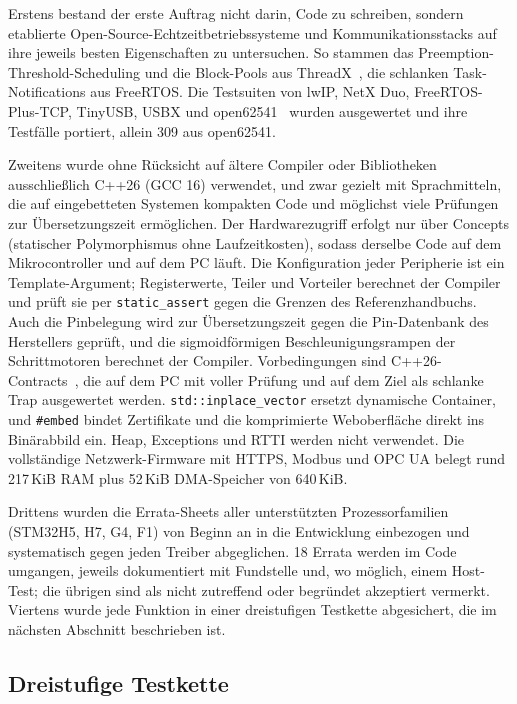 \documentclass[]{article}
\begin{document}
Erstens bestand der erste Auftrag nicht darin, Code zu schreiben, sondern etablierte Open-Source-Echtzeitbetriebssysteme und Kommunikationsstacks auf ihre jeweils besten Eigenschaften zu untersuchen. So stammen das Preemption-Threshold-Scheduling und die Block-Pools aus ThreadX~\cite{threadx}, die schlanken Task-Notifications aus FreeRTOS. Die Testsuiten von lwIP, NetX Duo, FreeRTOS-Plus-TCP, TinyUSB, USBX und open62541~\cite{open62541} wurden ausgewertet und ihre Testfälle portiert, allein 309 aus open62541.

Zweitens wurde ohne Rücksicht auf ältere Compiler oder Bibliotheken ausschließlich C++26 (GCC 16) verwendet, und zwar gezielt mit Sprachmitteln, die auf eingebetteten Systemen kompakten Code und möglichst viele Prüfungen zur Übersetzungszeit ermöglichen. Der Hardwarezugriff erfolgt nur über Concepts (statischer Polymorphismus ohne Laufzeitkosten), sodass derselbe Code auf dem Mikrocontroller und auf dem PC läuft. Die Konfiguration jeder Peripherie ist ein Template-Argument; Registerwerte, Teiler und Vorteiler berechnet der Compiler und prüft sie per \texttt{static\_assert} gegen die Grenzen des Referenzhandbuchs. Auch die Pinbelegung wird zur Übersetzungszeit gegen die Pin-Datenbank des Herstellers geprüft, und die sigmoidförmigen Beschleunigungsrampen der Schrittmotoren berechnet der Compiler. Vorbedingungen sind C++26-Contracts~\cite{p2900}, die auf dem PC mit voller Prüfung und auf dem Ziel als schlanke Trap ausgewertet werden. \texttt{std::inplace\_vector} ersetzt dynamische Container, und \texttt{\#embed} bindet Zertifikate und die komprimierte Weboberfläche direkt ins Binärabbild ein. Heap, Exceptions und RTTI werden nicht verwendet. Die vollständige Netzwerk-Firmware mit HTTPS, Modbus und OPC UA belegt rund 217\,KiB RAM plus 52\,KiB DMA-Speicher von 640\,KiB.

Drittens wurden die Errata-Sheets aller unterstützten Prozessorfamilien (STM32H5, H7, G4, F1) von Beginn an in die Entwicklung einbezogen und systematisch gegen jeden Treiber abgeglichen. 18 Errata werden im Code umgangen, jeweils dokumentiert mit Fundstelle und, wo möglich, einem Host-Test; die übrigen sind als nicht zutreffend oder begründet akzeptiert vermerkt. Viertens wurde jede Funktion in einer dreistufigen Testkette abgesichert, die im nächsten Abschnitt beschrieben ist.

\subsection{Dreistufige Testkette}
\end{document}
